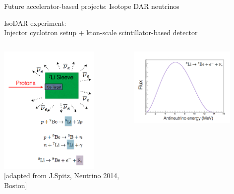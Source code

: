 \begin{frame}[t]{Future accelerator-based projects: Isotope DAR neutrinos}

IsoDAR experiment:\\
Injector cyclotron setup + kton-scale scintillator-based detector

\begin{columns}
  \begin{column}{0.50\textwidth}
     \includegraphics[width=0.75\textwidth]{./images/beyond3nu/future/isodar1.png}\\
     {\scriptsize \color{blue}[adapted from J.Spitz, Neutrino 2014, Boston]}
  \end{column}
  \begin{column}{0.50\textwidth}
     \includegraphics[width=0.80\textwidth]{./images/beyond3nu/future/isodar_flux.png}\\

\end{column}
\end{columns}
\end{frame}

